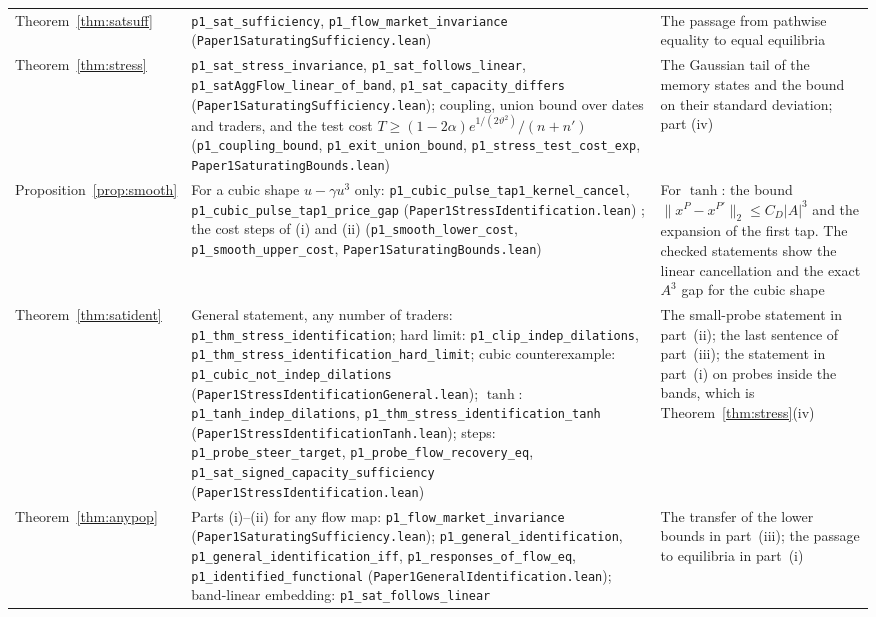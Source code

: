 \documentclass[12pt]{article}
\theoremstyle{definition}
\theoremstyle{remark}
\begin{document}
\begin{longtable}{>{\raggedright\arraybackslash}p{}>{\raggedright\arraybackslash}p{}>{\raggedright\arraybackslash}p{}}
Theorem~\ref{thm:satsuff} & \texttt{p1\_sat\_sufficiency}, \texttt{p1\_flow\_market\_invariance} (\nolinkurl{Paper1SaturatingSufficiency.lean}) & The passage from pathwise equality to equal equilibria\\
Theorem~\ref{thm:stress} & \texttt{p1\_sat\_stress\_invariance}, \texttt{p1\_sat\_follows\_linear}, \texttt{p1\_satAggFlow\_linear\_of\_band}, \texttt{p1\_sat\_capacity\_differs} (\nolinkurl{Paper1SaturatingSufficiency.lean}); coupling, union bound over dates and traders, and the test cost $T\ge(1-2\alpha)e^{1/(2\vartheta^2)}/(n+n')$ (\texttt{p1\_coupling\_bound}, \texttt{p1\_exit\_union\_bound}, \texttt{p1\_stress\_test\_cost\_exp}, \nolinkurl{Paper1SaturatingBounds.lean}) & The Gaussian tail of the memory states and the bound on their standard deviation; part (iv)\\
Proposition~\ref{prop:smooth} & For a cubic shape $u-\gamma u^3$ only: \texttt{p1\_cubic\_pulse\_tap1\_kernel\_cancel}, \texttt{p1\_cubic\_pulse\_tap1\_price\_gap} (\nolinkurl{Paper1StressIdentification.lean}) ; the cost steps of (i) and (ii) (\texttt{p1\_smooth\_lower\_cost}, \texttt{p1\_smooth\_upper\_cost}, \nolinkurl{Paper1SaturatingBounds.lean}) & For $\tanh$: the bound $\|x^P-x^{P'}\|_2\le C_D|A|^3$ and the expansion of the first tap. The checked statements show the linear cancellation and the exact $A^3$ gap for the cubic shape\\
Theorem~\ref{thm:satident} & General statement, any number of traders: \texttt{p1\_thm\_stress\_identification}; hard limit: \texttt{p1\_clip\_indep\_dilations}, \nolinkurl{p1_thm_stress_identification_hard_limit}; cubic counterexample: \texttt{p1\_cubic\_not\_indep\_dilations} (\nolinkurl{Paper1StressIdentificationGeneral.lean}); $\tanh$: \texttt{p1\_tanh\_indep\_dilations}, \nolinkurl{p1_thm_stress_identification_tanh} (\nolinkurl{Paper1StressIdentificationTanh.lean}); steps: \texttt{p1\_probe\_steer\_target}, \texttt{p1\_probe\_flow\_recovery\_eq}, \texttt{p1\_sat\_signed\_capacity\_sufficiency} (\nolinkurl{Paper1StressIdentification.lean}) & The small-probe statement in part~(ii); the last sentence of part~(iii); the statement in part~(i) on probes inside the bands, which is Theorem~\ref{thm:stress}(iv)\\
Theorem~\ref{thm:anypop} & Parts (i)--(ii) for any flow map: \texttt{p1\_flow\_market\_invariance} (\nolinkurl{Paper1SaturatingSufficiency.lean}); \texttt{p1\_general\_identification}, \texttt{p1\_general\_identification\_iff}, \texttt{p1\_responses\_of\_flow\_eq}, \texttt{p1\_identified\_functional} (\nolinkurl{Paper1GeneralIdentification.lean}); band-linear embedding: \texttt{p1\_sat\_follows\_linear} & The transfer of the lower bounds in part~(iii); the passage to equilibria in part~(i)\\

\end{longtable}
\end{document}
